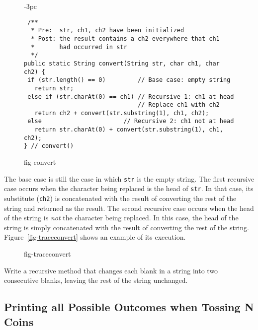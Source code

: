 \begin{figure}[htb]
\jjjprogstart
\begin{jjjlistingleft}[29pc]{-3pc}
\begin{lstlisting}
 /**
  * Pre:  str, ch1, ch2 have been initialized
  * Post: the result contains a ch2 everywhere that ch1 
  *       had occurred in str
  */
public static String convert(String str, char ch1, char ch2) {
 if (str.length() == 0)         // Base case: empty string
   return str;
 else if (str.charAt(0) == ch1) // Recursive 1: ch1 at head
                                // Replace ch1 with ch2
   return ch2 + convert(str.substring(1), ch1, ch2); 
 else                       // Recursive 2: ch1 not at head
   return str.charAt(0) + convert(str.substring(1), ch1, ch2);
} // convert()
\end{lstlisting}
\end{jjjlistingleft}
{fig-convert}
\end{figure}

The base case is still the case in which {\tt str} is the empty
string.  The first recursive case occurs when the character being
replaced is the head of {\tt str}. In that case, 
its substitute ({\tt ch2}) is concatenated with the result of
converting the rest of the string and returned as the result.   The second recursive case occurs
when the head of the string is {\it not} the character being
replaced.  In this case, the head of the string is simply concatenated
with the result of converting the rest of the
string.  Figure~\ref{fig-traceconvert} shows an example of its
execution.

\begin{figure}[h!]
 {fig-traceconvert}
\end{figure}

\pagebreak
{}
\label{self-study-exercise}
\begin{SSTUDY}

\item Write a recursive method that changes
each blank in a string into two consecutive blanks, leaving the rest
of the string \mbox{unchanged.}

\end{SSTUDY}

\subsection{Printing all Possible Outcomes when Tossing N Coins}

